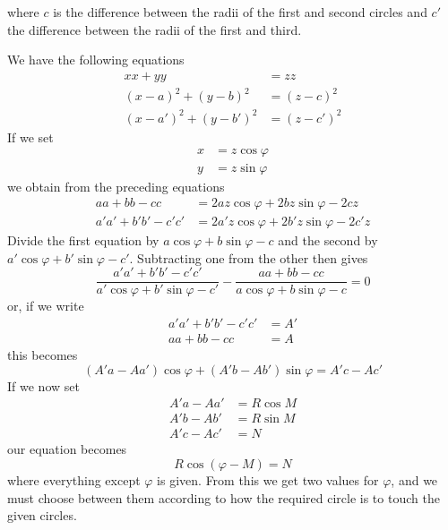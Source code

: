%
where \(c\) is the difference between the radii of the first and second circles and \(c'\) the difference between the radii of the first and third.

We have the following equations
\[
\begin{aligned}
xx+yy&=zz\\
(x-a)^2+(y-b)^2&=(z-c)^2\\
(x-a')^2+(y-b')^2&=(z-c')^2
\end{aligned}
\]
If we set
\[
\begin{aligned}x&=z\cos\varphi\\y&=z\sin\varphi\end{aligned}
\]
we obtain from the preceding equations
\[
\begin{aligned}
aa+bb-cc&=2az\cos\varphi+2bz\sin\varphi-2cz\\
a'a'+b'b'-c'c'&=2a'z\cos\varphi+2b'z\sin\varphi-2c'z
\end{aligned}
\]
Divide the first equation by \(a\cos\varphi+b\sin\varphi-c\) and the second by \(a'\cos\varphi+b'\sin\varphi-c'\). Subtracting one from the other then gives
\[
\frac{a'a'+b'b'-c'c'}{a'\cos\varphi+b'\sin\varphi-c'}-\frac{aa+bb-cc}{a\cos\varphi+b\sin\varphi-c}=0
\]
or, if we write
\[
\begin{aligned}a'a'+b'b'-c'c'&=A'\\aa+bb-cc&=A\end{aligned}
\]
this becomes
\[
(A'a-Aa')\cos\varphi+(A'b-Ab')\sin\varphi=A'c-Ac'
\]
If we now set
\[
\begin{aligned}A'a-Aa'&=R\cos M\\A'b-Ab'&=R\sin M\\A'c-Ac'&=N\end{aligned}
\]
our equation becomes
\[
R\cos(\varphi-M)=N
\]
where everything except \(\varphi\) is given. From this we get two values for \(\varphi\), and we must choose between them according to how the required circle is to touch the given circles.
